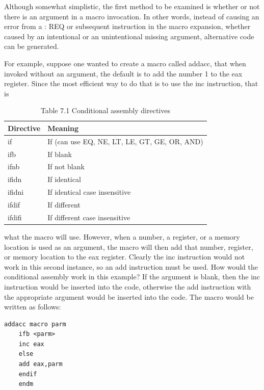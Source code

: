 \documentclass[10pt]{article}
\begin{document}
Although somewhat simplistic, the first method to be examined is whether or not there is an argument in a macro invocation. In other words, instead of causing an error from a : REQ or subsequent instruction in the macro expansion, whether caused by an intentional or an unintentional missing argument, alternative code can be generated.

For example, suppose one wanted to create a macro called addacc, that when invoked without an argument, the default is to add the number 1 to the eax register. Since the most efficient way to do that is to use the inc instruction, that is

\begin{table}[h]
\begin{center}
\captionsetup{labelformat=empty}
\caption{Table 7.1 Conditional assembly directives}
\begin{tabular}{|l|l|}
\hline
Directive & Meaning \\
\hline
if & If (can use EQ, NE, LT, LE, GT, GE, OR, AND) \\
\hline
ifb & If blank \\
\hline
ifnb & If not blank \\
\hline
ifidn & If identical \\
\hline
ifidni & If identical case insensitive \\
\hline
ifdif & If different \\
\hline
ifdifi & If different case insensitive \\
\hline
\end{tabular}
\end{center}
\end{table}

what the macro will use. However, when a number, a register, or a memory location is used as an argument, the macro will then add that number, register, or memory location to the eax register. Clearly the inc instruction would not work in this second instance, so an add instruction must be used. How would the conditional assembly work in this example? If the argument is blank, then the inc instruction would be inserted into the code, otherwise the add instruction with the appropriate argument would be inserted into the code. The macro would be written as follows:

\begin{verbatim}
addacc macro parm
    ifb <parm>
    inc eax
    else
    add eax,parm
    endif
    endm
\end{verbatim}
\end{document}
